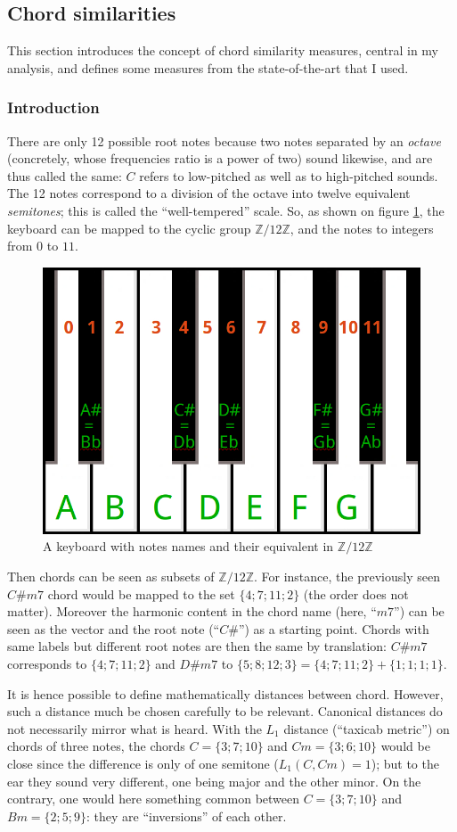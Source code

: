\documentclass[a4paper,10pt]{article}
\newcommand{\guill}[1]{``#1''}
\begin{document}
\subsection{Chord similarities}

This section introduces the concept of chord similarity measures, central in my analysis, and defines some measures from the state-of-the-art that I used.

\subsubsection{Introduction}

There are only 12 possible root notes because two notes separated by an \emph{octave} (concretely, whose frequencies ratio is a power of two) sound likewise, and are thus called the same: $C$ refers to low-pitched as well as to high-pitched sounds. The 12 notes correspond to a division of the octave into twelve equivalent \emph{semitones}; this is called the \guill{well-tempered} scale. 
So, as shown on figure \ref{keyboard}, the keyboard can be mapped to the cyclic group $\mathbb{Z}/12\mathbb{Z}$, and the notes to integers from $0$ to $11$.

\begin{figure}[h!]
\centering
\includegraphics[width=5
cm]{images/keyboard+.jpg}
\caption{A keyboard with notes names and their equivalent in $\mathbb{Z}/12\mathbb{Z}$\label{keyboard}}
\end{figure}

Then chords can be seen as subsets of $\mathbb{Z}/12\mathbb{Z}$. For instance, the previously seen $C\#m7$ chord would be mapped to the set $\{4;7;11;2\}$ (the order does not matter). Moreover the harmonic content in the chord name (here, \guill{$m7$}) can be seen as the vector and the root note (\guill{$C\#$}) as a starting point. Chords with same labels but different root notes are then the same by translation: $C\#m7$ corresponds to $\{4;7;11;2\}$ and $D\#m7$ to $\{5;8;12;3\}=\{4;7;11;2\}+\{1;1;1;1\}$.

It is hence possible to define mathematically distances between chord. However, such a distance much be chosen carefully to be relevant. Canonical distances do not necessarily mirror what is heard. With the $L_1$ distance (\guill{taxicab metric}) on chords of three notes, the chords $C=\{3;7;10\}$ and $Cm=\{3;6;10\}$ would be close since the difference is only of one semitone ($L_1(C,Cm)=1$); but to the ear they sound very different, one being major and the other minor. On the contrary, one would here something common between $C=\{3;7;10\}$ and $Bm=\{2;5;9\}$: they are \guill{inversions} of each other.
\end{document}
